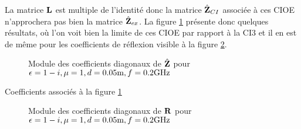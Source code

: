       La matrice \(\mathbf{L}\) est multiple de l'identité donc la matrice \(\hat{\mathbf{Z}}_{CI}\) associée à ces CIOE n'approchera pas bien la matrice \(\hat{\mathbf{Z}}_{ex}\).
      La figure \ref{fig:imp_fourier:plan:stupfel:hoibc} présente donc quelques résultats, où l'on voit bien la limite de ces CIOE par rapport à la CI3 et il en est de même pour les coefficients de réflexion visible à la figure \ref{fig:reflex_fourier:plan:stupfel:hoibc}.
      \begin{figure}[!hbt]
        \centering
        
        \caption[Module de l'opérateur de Calderón, comparé avec les approximations CI0, CI01, CI1, CI3 pour une couche plane de matériau de B.~Stupfel]{Module des coefficients diagonaux de \(\hat{\mathbf{Z}}\) pour \(\epsilon = 1-i, \mu = 1, d=0.05\text{m}, f=0.2\text{GHz}\)}
        \label{fig:imp_fourier:plan:stupfel:hoibc}
      \end{figure}
      \begin{table}[!hbt]
        \centering

        \caption{Coefficients associés à la figure \ref{fig:imp_fourier:plan:stupfel:hoibc}}
        \label{tab:imp_fourier:plan:stupfel:hoibc}
      \end{table}
      
      \begin{figure}[!hbt]
        \centering
        
        \caption[Module des coefficients de réflexions exacts, comparé avec les approximations CI0, CI01, CI1, CI3 pour une couche plane de matériau de B.~Stupfel]{Module des coefficients diagonaux de \(\mathbf{R}\) pour \(\epsilon = 1-i, \mu = 1, d=0.05\text{m}, f=0.2\text{GHz}\)}
        \label{fig:reflex_fourier:plan:stupfel:hoibc}
      \end{figure}

      \FloatBarrier

